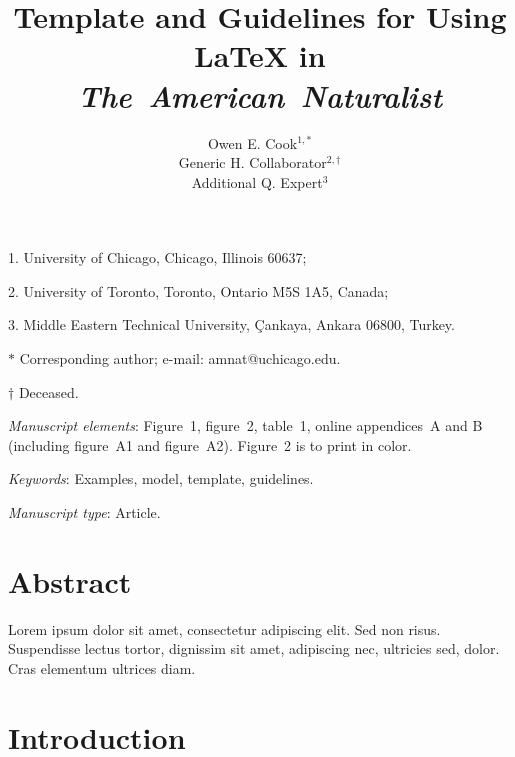 \documentclass[11pt]{article}
\title{Template and Guidelines for Using \LaTeX{} in \textit{The~American~Naturalist} }
\author{Owen E. Cook$^{1,\ast}$ \\
Generic H. Collaborator$^{2,\dag}$ \\
Additional Q. Expert$^{3}$}
\date{}
\begin{document}
\maketitle

\noindent{} 1. University of Chicago, Chicago, Illinois 60637;

\noindent{} 2. University of Toronto, Toronto, Ontario M5S 1A5, Canada;

\noindent{} 3. Middle Eastern Technical University, Çankaya, Ankara 06800, Turkey.

\noindent{} $\ast$ Corresponding author; e-mail: amnat@uchicago.edu.

\noindent{} $\dag$ Deceased.

\bigskip

\textit{Manuscript elements}: Figure~1, figure~2, table~1, online appendices~A and B (including figure~A1 and figure~A2). Figure~2 is to print in color.

\bigskip

\textit{Keywords}: Examples, model, template, guidelines.

\bigskip

\textit{Manuscript type}: Article. %

\bigskip



\newpage{}

\section*{Abstract}

Lorem ipsum dolor sit amet, consectetur adipiscing elit. Sed non risus. Suspendisse lectus tortor, dignissim sit amet, adipiscing nec, ultricies sed, dolor. Cras elementum ultrices diam.

\newpage{}

\section*{Introduction}

\end{document}
